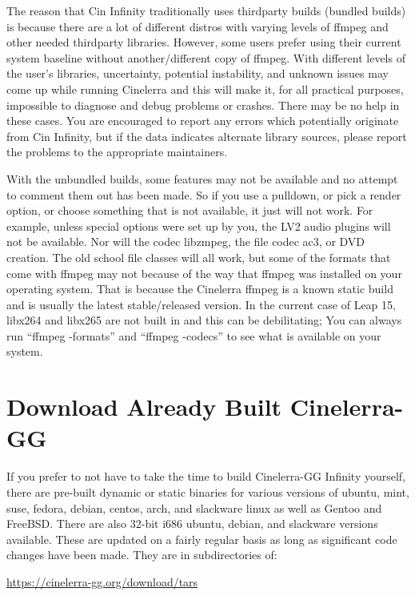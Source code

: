 The reason that Cin Infinity traditionally uses thirdparty builds (bundled builds) is because there are a lot of different distros with varying levels of ffmpeg and other needed thirdparty libraries.  
However, some users prefer using their current system baseline without another/different copy of ffmpeg.  
With different levels of the user’s libraries, uncertainty, potential instability, and unknown issues may come up while running Cinelerra and this will make it, for all practical purposes, impossible to diagnose and debug problems or crashes.  
There may be no help in these cases.  You are encouraged to report any errors which potentially originate from Cin Infinity, but if the data indicates alternate library sources, please report the problems to the appropriate maintainers.

With the unbundled builds, some features may not be available and no attempt to comment them out has been made.  
So if you use a pulldown, or pick a render option, or choose something that is not available, it just will not work.  
For example, unless special options were set up by you, the LV2 audio plugins will not be available.  
Nor will the codec libzmpeg, the file codec ac3, or DVD creation.  
The old school file classes will all work, but some of the formats that come with ffmpeg may not because of the way that ffmpeg was installed on your operating system.  
That is because the Cinelerra ffmpeg is a known static build and is usually the latest stable/released version.  
In the current case of Leap 15, libx264 and libx265 are not built in and this can be debilitating;  You can always run “ffmpeg -formats” and “ffmpeg -codecs” to see what is available on your system.


\section{Download Already Built Cinelerra-GG}%
\label{sec:download_already_built_cinelerra_gg}

If you prefer to not have to take the time to build Cinelerra-GG Infinity yourself, there are pre-built dynamic or static binaries for various versions of ubuntu, mint, suse, fedora, debian, centos, arch, and slackware linux as well as Gentoo and FreeBSD.  
There are also 32-bit i686 ubuntu, debian, and slackware versions available.  
These are updated on a fairly regular basis as long as significant code changes have been made.  
They are in subdirectories of:

\url{https://cinelerra-gg.org/download/tars}

